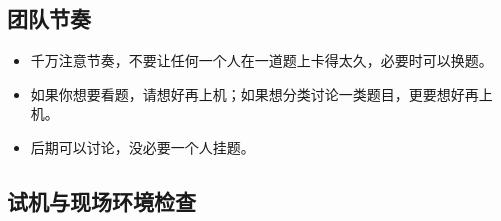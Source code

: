 \subsection{团队节奏}
\begin{itemize}[leftmargin=5mm]
  \setlength{\itemsep}{0pt}
  \item 千万注意节奏，不要让任何一个人在一道题上卡得太久，必要时可以换题。
  \item 如果你想要看题，请想好再上机；如果想分类讨论一类题目，更要想好再上机。
  \item 后期可以讨论，没必要一个人挂题。
\end{itemize}

\subsection{试机与现场环境检查}

